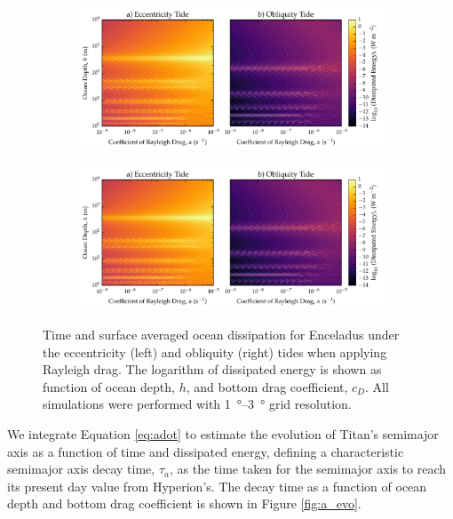 \begin{figure}[!t]
    \centering
    \begin{subfigure}[t]{0.85\linewidth} %
        \includegraphics[width=\linewidth]{Figures/enceladus_linear}
        \label{fig:lincEccEncel}
    \end{subfigure}
    \begin{subfigure}[t]{0\linewidth} %
         \includegraphics[width=\linewidth]{Figures/enceladus_linear}
         \label{fig:linObliqEncel} 
    \end{subfigure}
    \vspace{-0.5cm}
\caption{Time and surface averaged ocean dissipation for Enceladus under the eccentricity (left) and obliquity (right) tides when applying Rayleigh drag. The logarithm of dissipated energy is shown as function of ocean depth, $h$, and bottom drag coefficient, $c_D$. All simulations were performed with \SIrange{1}{3}{\degree} grid resolution. \label{fig:linEncel}}
\end{figure}

We integrate Equation \ref{eq:adot} to estimate the evolution of Titan's semimajor axis as a function of time and dissipated energy, defining a characteristic semimajor axis decay time, $\tau_{a}$, as the time taken for the semimajor axis to reach its present day value from Hyperion's. The decay time as a function of ocean depth and bottom drag coefficient is shown in Figure \ref{fig:a_evo}.
  
